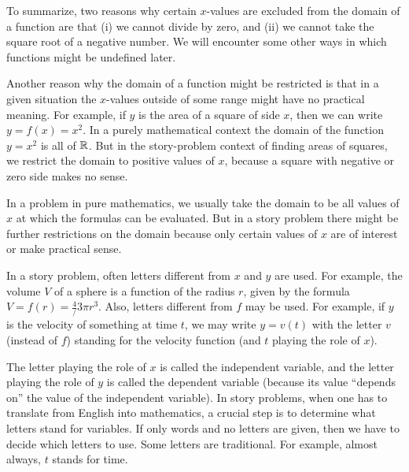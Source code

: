 To summarize, two reasons why certain $x$-values are excluded from the
domain of a function are that (i) we cannot divide by zero, and (ii)
we cannot take the square root of a negative number. We will
encounter some other ways in which functions might be undefined later.

Another reason why the domain of a function might be restricted is
that in a given situation the $x$-values outside of some range might
have no practical meaning.  For example, if $y$ is the area of a
square of side $x$, then we can write $y=f(x)=x^2$.  In a purely
mathematical context the domain of the function $y=x^2$ is all of
$\mathbb{R}$.  But in the story-problem context of finding areas of squares,
we restrict the domain to positive values of $x$, because a square
with negative or zero side makes no sense.

In a problem in pure mathematics, we usually take the domain to be all
values of $x$ at which the formulas can be evaluated.  But in
a story problem there might be further restrictions on the domain
because only certain values of $x$ are of interest or make practical
sense.

In a story problem, often letters different from $x$ and $y$ are used.
For example, the volume $V$ of a sphere is a function of the radius
$r$, given by the formula $V=f(r)=\frac4/3\pi r^3$.
Also, letters different from $f$ may be used.  For example, if $y$ is
the velocity of something at time $t$, we may write $y=v(t)$ with
the letter $v$ (instead of $f$) standing for the velocity function (and
$t$ playing the role of $x$).

The letter playing the role of $x$ is called the {\dfont independent
variable}, and the letter playing the role of $y$ is called the
{\dfont dependent variable} (because its
value ``depends on'' the value of the independent
variable).  In story problems, when one
has to translate from English into mathematics, a crucial step is to
determine what letters stand for variables.  If only words and no
letters are given, then we have to decide which letters to use.  Some
letters are traditional.  For example, almost always, $t$ stands for
time.

